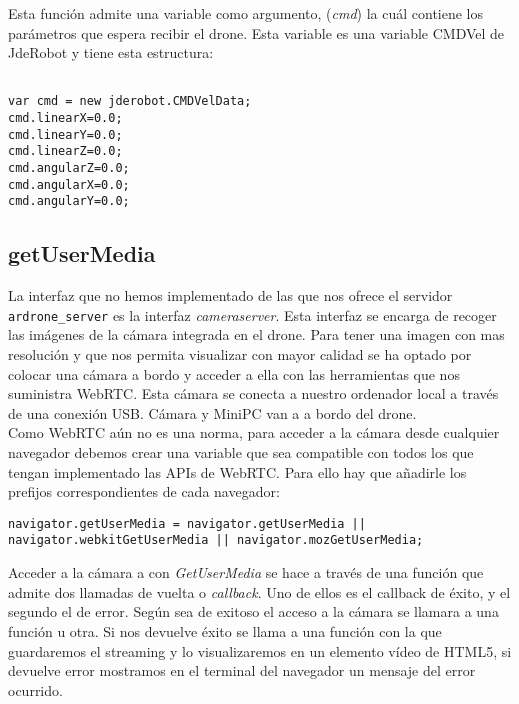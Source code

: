 Esta función admite una variable como argumento, (\emph{cmd}) la cuál contiene los parámetros que espera recibir el drone. Esta variable es una variable CMDVel de JdeRobot y tiene esta estructura:\\

\begin{lstlisting}[caption=Variable CMD]

var cmd = new jderobot.CMDVelData; 
cmd.linearX=0.0;
cmd.linearY=0.0;
cmd.linearZ=0.0;
cmd.angularZ=0.0;
cmd.angularX=0.0;
cmd.angularY=0.0;

\end{lstlisting}




\subsection{getUserMedia}

La interfaz que no hemos implementado de las que nos ofrece el servidor \texttt{ardrone\_server} es la interfaz \emph{cameraserver}. Esta interfaz se encarga de recoger las imágenes de la cámara integrada en el drone. Para tener una imagen con mas resolución y que nos permita visualizar con mayor calidad se ha optado por colocar una cámara a bordo y acceder a ella con las herramientas que nos suministra WebRTC. Esta cámara se conecta a nuestro ordenador local a través de una conexión USB. Cámara y MiniPC van a a bordo del drone.\\

Como WebRTC aún no es una norma, para acceder a la cámara desde cualquier navegador debemos crear una variable que sea compatible con todos los que tengan implementado las APIs de WebRTC. Para ello hay que añadirle los prefijos correspondientes de cada navegador:\\


\begin{lstlisting}[caption=Variable de getUserMedia.]
navigator.getUserMedia = navigator.getUserMedia || navigator.webkitGetUserMedia || navigator.mozGetUserMedia;
\end{lstlisting}


Acceder a la cámara a con \emph{GetUserMedia} se hace a través de una función que admite dos llamadas de vuelta o \emph{callback}. Uno de ellos es el callback de éxito, y el segundo el de error. Según sea de exitoso el acceso a la cámara se llamara a una función u otra. Si nos devuelve éxito se llama a una función con la que guardaremos el streaming y lo visualizaremos en un elemento vídeo de HTML5, si devuelve error mostramos en el terminal del navegador un mensaje del error ocurrido.\\

